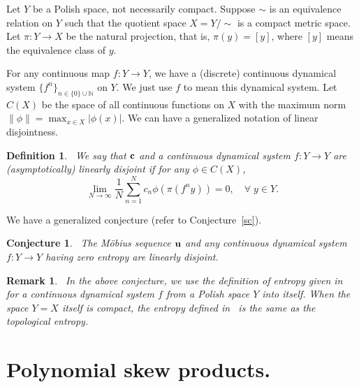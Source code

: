 \documentclass[12pt,letterpaper]{amsart}
\newtheorem{remark}{Remark}
\newtheorem {definition}{Definition}
\newtheorem {conjecture}{Conjecture}
\newcommand {\N} {{\mathbb N}}
\begin{document}
Let $Y$ be a Polish space, not necessarily compact. 
Suppose $\sim$ is an equivalence relation on $Y$ such that the quotient space $X=Y/\sim$ is a compact metric space.
Let $\pi: Y\to X$ be the natural projection, that is, $\pi (y)=[y]$, where $[y]$ means the equivalence class of $y$.  

For any continuous map $f: Y\to Y$, we have a (discrete) continuous dynamical system $\{f^{n}\}_{n\in \{0\}\cup \N}$ on $Y$. We just use $f$ to mean this dynamical system. 
Let $C(X)$ be the space of all continuous functions on $X$ with the maximum norm $\|\phi\|=\max_{x\in X} |\phi (x)|$. We can have a generalized notation of linear disjointness. 

\medskip 
\begin{definition}~\label{gld}
We say that ${\bf c}$ and a continuous dynamical system $f:Y\to Y$ are (asymptotically) linearly disjoint if for any $\phi\in C(X)$,
\begin{equation}\label{disjointness}
  \lim_{N\to \infty} \frac{1}{N}\sum_{n=1}^N c_n \phi (\pi (f^{n}y)) =0,\quad \forall\; y\in Y.
\end{equation}
\end{definition}

We have a generalized conjecture (refer to Conjecture~\ref{sc}).  

\medskip
\begin{conjecture}~\label{gsc}
The M\"obius sequence ${\bf u}$ and any continuous dynamical system $f: Y\to Y$ having zero entropy are linearly disjoint.
\end{conjecture}

\medskip

\begin{remark}~\label{pl}
In the above conjecture, we use the definition of entropy given in~\cite{DJ} for a continuous dynamical system $f$ from a Polish space $Y$ into itself. When the space $Y=X$ itself is compact, the entropy defined in~\cite{DJ} is the same as the topological entropy. 
\end{remark} 


\section{Polynomial skew products.}~\label{psp}
\end{document}
